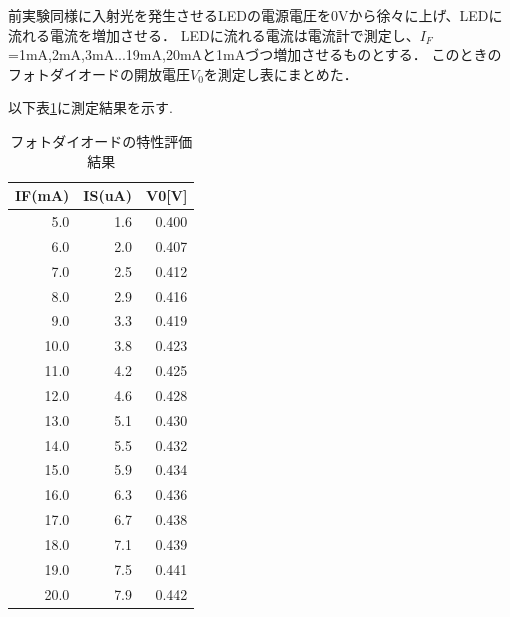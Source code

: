 \documentclass[titlepage]{jarticle}
\begin{document}
前実験同様に入射光を発生させるLEDの電源電圧を0Vから徐々に上げ、LEDに流れる電流を増加させる．
LEDに流れる電流は電流計で測定し、$I_F$=1mA,2mA,3mA...19mA,20mAと1mAづつ増加させるものとする．
このときのフォトダイオードの開放電圧$V_0$を測定し表にまとめた．

以下表\ref{フォトダイオードの特性評価結果}に測定結果を示す.
\begin{table}[htbp]
    \begin{center}
        \caption{フォトダイオードの特性評価結果}
        \begin{tabular}{r|r|r}
            \hline\hline
            \multicolumn{1}{l|}{IF(mA)} & \multicolumn{1}{l|}{IS(uA)} & \multicolumn{1}{l}{V0[V]} \\ \hline
            5.0                         & 1.6                         & 0.400                     \\ \hline
            6.0                         & 2.0                         & 0.407                     \\ \hline
            7.0                         & 2.5                         & 0.412                     \\ \hline
            8.0                         & 2.9                         & 0.416                     \\ \hline
            9.0                         & 3.3                         & 0.419                     \\ \hline
            10.0                        & 3.8                         & 0.423                     \\ \hline
            11.0                        & 4.2                         & 0.425                     \\ \hline
            12.0                        & 4.6                         & 0.428                     \\ \hline
            13.0                        & 5.1                         & 0.430                     \\ \hline
            14.0                        & 5.5                         & 0.432                     \\ \hline
            15.0                        & 5.9                         & 0.434                     \\ \hline
            16.0                        & 6.3                         & 0.436                     \\ \hline
            17.0                        & 6.7                         & 0.438                     \\ \hline
            18.0                        & 7.1                         & 0.439                     \\ \hline
            19.0                        & 7.5                         & 0.441                     \\ \hline
            20.0                        & 7.9                         & 0.442                     \\ \hline
        \end{tabular}
        \label{フォトダイオードの特性評価結果}
    \end{center}
\end{table}
\end{document}
